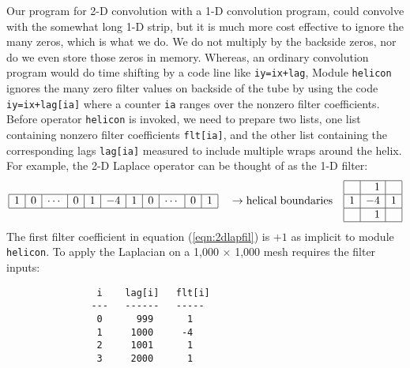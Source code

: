 \par
Our program for 2-D convolution with a 1-D convolution program,
could convolve with the somewhat long 1-D strip,
but it is much more cost effective to ignore the many zeros,
which is what we do.
We do not multiply by the backside zeros, nor do we even store those zeros in memory.
Whereas, an ordinary convolution program would do time shifting
by a code line like {\tt iy=ix+lag},
Module
\texttt{helicon} %
ignores the many zero filter values on backside of the tube
by using the code {\tt iy=ix+lag[ia]}
where a counter {\tt ia} ranges over the nonzero filter coefficients.
Before operator {\tt helicon} is invoked,
we need to prepare two lists,
one list containing nonzero filter coefficients {\tt flt[ia]},
and the other list containing the corresponding lags {\tt lag[ia]}
measured to include multiple wraps around the helix.
For example, the 2-D Laplace operator
can be thought of as the 1-D filter:
\begin{equation}
\label{eqn:2dlapfil}
\begin{array}{|r|r|r|r|r|r|r|r|r|r|r|r|r|r|r|} \hline
1&0&\cdots&0&1&-4&1&0& \cdots&0&1
\\ \hline
\end{array}
%
\quad
\rightarrow{\rm helical \; boundaries}
\quad
\begin{array}{|r|r|r|}  \hline
& 1 & \\
\hline
1 & -4 & 1\\
\hline
& 1 & \\
\hline
\end{array}
\end{equation}
%
%
%
The first filter coefficient in equation (\ref{eqn:2dlapfil})
is $+1$ as implicit to module {\tt helicon}.
To apply the Laplacian on a 1,000 $\times$ 1,000 mesh
requires the filter inputs:
\par\noindent
\footnotesize
\begin{verbatim}
                i    lag[i]   flt[i]
               ---   ------   -----
                0      999      1
                1     1000     -4
                2     1001      1
                3     2000      1
\end{verbatim}
\normalsize

